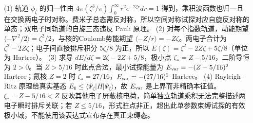 (1) 轨道 \(\phi_\zeta\) 的归一性由 \(4\pi(\zeta^3/\pi)\int_0^\infty r^2e^{-2\zeta r}dr=1\) 得到，乘积波函数也归一且在交换两电子时对称。费米子总态需反对称，所以空间对称试探对应自旋反对称的单态；双电子同轨道的自旋三态违反 Pauli 原理。
(2) 对每个指数轨道，动能期望 \(\langle-\nabla^2/2\rangle=\zeta^2/2\)，与核的Coulomb势能期望 \(\langle-Z/r\rangle=-Z\zeta\)。两电子合计为 \(\zeta^2-2Z\zeta\)；电子间直接排斥积分 \(5\zeta/8\) 为正，所以 \(E(\zeta)=\zeta^2-2Z\zeta+5\zeta/8\)（单位为 Hartree）。
(3) 求导 \(dE/d\zeta=2\zeta-2Z+5/8\)，极小点 \(\zeta_*=Z-5/16\)，二阶导恒为 \(2>0\)。当 \(Z>5/16\) 时此点合法，最小试探能量为 \(E_{\rm var}=-(Z-5/16)^2\) Hartree；氦核 \(Z=2\) 时 \(\zeta_*=27/16\)，\(E_{\rm var}=-(27/16)^2\) Hartree。
(4) Rayleigh–Ritz 原理给真实基态 \(E_0\le\langle\Psi_\zeta|H|\Psi_\zeta\rangle\)，故 \(E_{\rm var}\) 是上界而非精确本征值。\(\zeta_*=Z-5/16<Z\) 反映其他电子屏蔽核电荷，简单独立轨道乘积无法完整描述两电子瞬时排斥关联；若 \(Z\le5/16\)，形式驻点非正，超出此单参数束缚试探的有效极小域，不能使用该表达式宣布存在真正束缚态。
